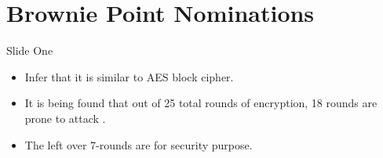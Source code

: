 \section{Brownie Point Nominations}

\begin{frame}{Slide One}


\begin{itemize}
\item Infer that it is similar to AES block cipher.
\item It is being found that out of 25 total rounds of encryption, 18 rounds are prone to attack . 
\item The left over 7-rounds are for security purpose.
\end{itemize}

\end{frame}

